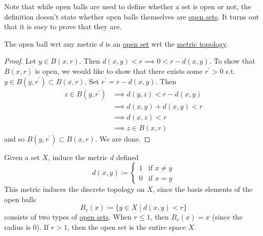   Note that while open balls are used to define whether a set is open or not, the definition doesn't state whether open balls themselves are \hyperref[def:open-set]{open sets}. It turns out that it is easy to prove that they are. 
  
  \begin{lemma}
    \label{thm:open-balls-are-open-sets}
    The open ball wrt any metric $d$ is an \hyperref[def:open-set]{open set} wrt the \hyperref[def:metric-topology]{metric topology}. 
  \end{lemma}
  \begin{proof}
    Let $y \in B(x, r)$. Then $d(x, y) < r \implies 0 < r - d(x, y)$. To show that $B(x, r)$ is open, we would like to show that there exists some $r^\prime > 0$ s.t. $y \in B(y, r^\prime) \subset B(x, r)$. Set $r^\prime = r - d(x, y)$. Then 
    \begin{align}
      z \in B(y, r^\prime) & \implies d(y, z) < r - d(x, y) \\
                           & \implies d(x, y) + d(x, y) < r \\
                           & \implies d(x, z) < r \\
                           & \implies z \in B(x, r)
    \end{align} 
    and so $B(y, r^\prime) \subset B(x, r)$. We are done. 
  \end{proof}

  \begin{example}
    \label{ex:discrete-metric-induces-discrete-topology}
    Given a set $X$, induce the metric $d$ defined
    \begin{equation}
      d(x, y) \coloneqq \begin{cases} 1 & \text{if } x \neq y \\ 0 & \text{if } x = y \end{cases}
    \end{equation}
    This metric induces the discrete topology on $X$, since the basis elements of the open balls
    \begin{equation}
      B_r (x) \coloneqq \{ y \in X \mid d(x, y) <r\}
    \end{equation}
    consists of two types of \hyperref[def:open-set]{open sets}. When $r \leq 1$, then $B_r (x) = x$ (since the radius is $0$). If $r > 1$, then the open set is the entire space $X$. 
  \end{example} 

